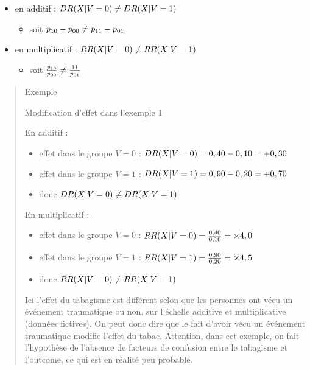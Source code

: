 \documentclass[
]{book}
\providecommand{\tightlist}{%
  \setlength{\itemsep}{0pt}\setlength{\parskip}{0pt}}
\begin{document}
\begin{itemize}
\tightlist
\item
  en additif : \(\small DR(X | V=0) \neq DR(X | V=1)\)

  \begin{itemize}
  \tightlist
  \item
    soit \(\small p_{10}-p_{00} \neq p_{11}-p_{01}\)\\
  \end{itemize}
\item
  en multiplicatif : \(\small RR(X | V=0) \neq RR(X | V=1)\)

  \begin{itemize}
  \tightlist
  \item
    soit \(\small \frac{p_{10}}{p_{00}} \neq \frac{{11}}{p_{01}}\)
  \end{itemize}
\end{itemize}

\begin{quote}
Exemple

Modification d'effet dans l'exemple 1

En additif :

\begin{itemize}
\tightlist
\item
  effet dans le groupe \(V=0\) : \(\small DR (X | V=0) = 0,40 - 0,10 = +0,30\)
\item
  effet dans le groupe \(V=1\) : \(\small DR (X | V=1) = 0,90 - 0,20 = +0,70\)
\item
  donc \(\small DR (X | V=0) \neq DR (X | V=1)\)
\end{itemize}

En multiplicatif :

\begin{itemize}
\tightlist
\item
  effet dans le groupe \(V=0\) : \(\small RR(X | V=0) = \frac{0,40}{0,10} = \times 4,0\)
\item
  effet dans le groupe \(V=1\) : \(\small RR(X | V=1) = \frac{0,90}{0,20} = \times 4,5\)
\item
  donc \(\small RR(X | V=0) \neq RR(X | V=1)\)
\end{itemize}

Ici l'effet du tabagisme est différent selon que les personnes ont vécu un événement traumatique ou non, sur l'échelle additive et multiplicative (données fictives). On peut donc dire que le fait d'avoir vécu un événement traumatique modifie l'effet du tabac. Attention, dans cet exemple, on fait l'hypothèse de l'absence de facteurs de confusion entre le tabagisme et l'outcome, ce qui est en réalité peu probable.
\end{quote}
\end{document}

